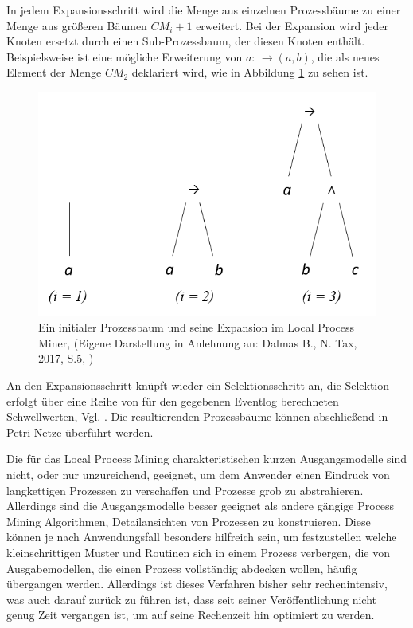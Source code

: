 In jedem Expansionsschritt wird die Menge aus einzelnen Prozessbäume zu einer Menge aus größeren Bäumen $CM_i+1$ erweitert. Bei der Expansion wird jeder Knoten ersetzt durch einen Sub-Prozessbaum, der diesen Knoten enthält. Beispielsweise ist eine mögliche Erweiterung von $a$: $ →(a,b)$, die als neues Element der Menge $CM_2$ deklariert wird, wie in Abbildung \ref{fig:lpmExample} zu sehen ist. 
\begin{figure}[!h]
    \centering
    \includegraphics[scale=0.45]{figures/Appbildungen/lpm_example.PNG}
    \caption{Ein initialer Prozessbaum und seine Expansion im Local Process Miner, (Eigene Darstellung in Anlehnung an: Dalmas B., N. Tax, 2017, S.5, \cite{lpm}) }
    \label{fig:lpmExample}
\end{figure}

An den Expansionsschritt knüpft wieder ein Selektionsschritt an, die Selektion erfolgt über eine Reihe von für den gegebenen Eventlog berechneten Schwellwerten, Vgl. \cite{lpm}. Die resultierenden Prozessbäume können abschließend in Petri Netze überführt werden.

Die für das Local Process Mining charakteristischen kurzen Ausgangsmodelle sind nicht, oder nur unzureichend, geeignet, um dem Anwender einen Eindruck von langkettigen Prozessen zu verschaffen und Prozesse grob zu abstrahieren. Allerdings sind die Ausgangsmodelle besser geeignet als andere gängige Process Mining Algorithmen, Detailansichten von Prozessen zu konstruieren. 
Diese können je nach Anwendungsfall besonders hilfreich sein, um festzustellen welche kleinschrittigen Muster und Routinen sich in einem Prozess verbergen, die von Ausgabemodellen, die einen Prozess vollständig abdecken wollen, häufig übergangen werden. Allerdings ist dieses Verfahren bisher sehr rechenintensiv, was auch darauf zurück zu führen ist, dass seit seiner Veröffentlichung nicht genug Zeit vergangen ist, um auf seine Rechenzeit hin optimiert zu werden.

